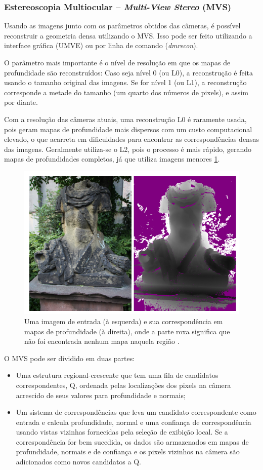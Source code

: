 \subsubsection*{Estereoscopia Multiocular -- \emph{Multi-View Stereo} (MVS)}

Usando as imagens junto com os parâmetros obtidos das câmeras, é possível
reconstruir a geometria densa utilizando o MVS. Isso pode ser feito utilizando a
interface gráfica (UMVE) ou por linha de comando (\emph{dmrecon}).

O parâmetro mais importante é o nível de resolução em que os mapas de
profundidade são reconstruídos: Caso seja nível 0 (ou L0), a reconstrução é
feita usando o tamanho original das imagens. Se for nível 1 (ou L1), a
reconstrução corresponde a metade do tamanho (um quarto dos números de pixels),
e assim por diante.

Com a resolução das câmeras atuais, uma reconstrução L0 é raramente usada, pois
geram mapas de profundidade mais dispersos com um custo computacional elevado, o
que acarreta em dificuldades para encontrar as correspondências densas das
imagens. Geralmente utiliza-se o L2, pois o processo é mais rápido, gerando
mapas de profundidades completos, já que utiliza imagens menores
\ref{fig:mvedepth}.

\begin{figure}[!h]
	\centering
	\includegraphics[width=0.4\linewidth]{figs/mvedepth.png}
	\caption{%
	Uma imagem de entrada (à esquerda) e sua correspondência em mapas de profundidade (à direita), onde a parte roxa significa que não foi encontrada nenhum mapa naquela região \protect\cite{mve}.
	}\label{fig:mvedepth}
\end{figure}

O MVS pode ser dividido em duas partes:
\begin{itemize}
\item {Uma estrutura regional-crescente que tem uma fila de candidatos correspondentes, Q, ordenada pelas localizações dos pixels na câmera acrescido de seus valores para profundidade e normais;}
\item {Um sistema de correspondências que leva um candidato correspondente como entrada e calcula profundidade, normal e uma confiança de correspondência usando vistas vizinhas fornecidas pela seleção de exibição local. Se a correspondência for bem sucedida, os dados são armazenados em mapas de profundidade, normais e de confiança e os pixels vizinhos na câmera são adicionados como novos candidatos a Q.}
\end{itemize}

